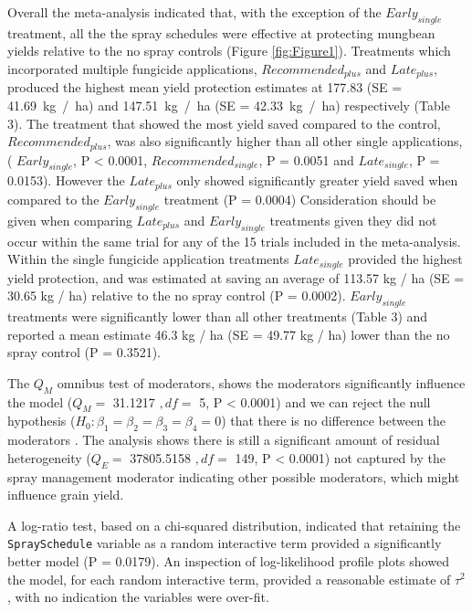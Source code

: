 \documentclass[agronomy,article,submit,moreauthors,pdftex]{mdpi}
\begin{document}
Overall the meta-analysis indicated that, with the exception of the \(Early_{single}\) treatment, all the the spray schedules were effective at protecting mungbean yields relative to the no spray controls (Figure \ref{fig:Figure1}).
Treatments which incorporated multiple fungicide applications, \(Recommended_{plus}\) and \(Late_{plus}\), produced the highest mean yield protection estimates at 177.83 (SE = 41.69~kg~/~ha) and 147.51~kg~/~ha (SE = 42.33~kg~/~ha) respectively (Table 3).
The treatment that showed the most yield saved compared to the control, \(Recommended_{plus}\), was also significantly higher than all other single applications, (
\(Early_{single}\), P \textless{} 0.0001,
\(Recommended_{single}\), P = 0.0051 and
\(Late_{single}\), P = 0.0153).
However the \(Late_{plus}\) only showed significantly greater yield saved when compared to the \(Early_{single}\) treatment (P = 0.0004)
Consideration should be given when comparing \(Late_{plus}\) and \(Early_{single}\) treatments given they did not occur within the same trial for any of the 15 trials included in the meta-analysis.
Within the single fungicide application treatments \(Late_{single}\) provided the highest yield protection, and was estimated at saving an average of 113.57 kg / ha (SE = 30.65 kg / ha) relative to the no spray control (P = 0.0002).
\(Early_{single}\) treatments were significantly lower than all other treatments (Table 3) and reported a mean estimate 46.3 kg / ha (SE = 49.77 kg / ha) lower than the no spray control (P = 0.3521).

The \(Q_M\) omnibus test of moderators, shows the moderators significantly influence the model (\(Q_M =\) 31.1217 \(,df =\) 5, P \textless{} 0.0001) and we can reject the null hypothesis (\(H_0 : \beta_1 = \beta_2 = \beta_3 =\beta_4 = 0\)) that there is no difference between the moderators \citep{Viechtbauer2010}.
The analysis shows there is still a significant amount of residual heterogeneity (\(Q_E =\) 37805.5158 \(,df=\) 149, P \textless{} 0.0001) not captured by the spray management moderator indicating other possible moderators, which might influence grain yield.

A log-ratio test, based on a chi-squared distribution, indicated that retaining the \texttt{SpraySchedule} variable as a random interactive term provided a significantly better model (P = 0.0179).
An inspection of log-likelihood profile plots showed the model, for each random interactive term, provided a reasonable estimate of \(\tau^2\), with no indication the variables were over-fit.
\end{document}
